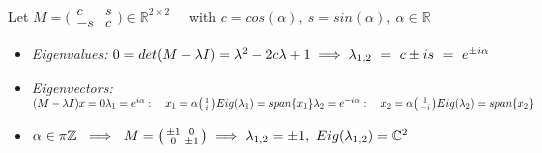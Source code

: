 \begin{SolutionSheet}[\ref{sheet1}]
  \begin{Solution}
    Let $M=\big(\begin{smallmatrix}
      c & s\\
      -s & c
    \end{smallmatrix}\big) \in \mathbb{R}^{2\times 2} \quad$ with $c = cos(\alpha), \ s = sin(\alpha), \ \alpha \in \mathbb{R}$ \\
    \begin{itemize}
      \item \textit{Eigenvalues:} $0 = det(M-\lambda I) = \lambda^2 - 2c\lambda + 1 \\
        \implies \lambda_{1,2} \ = \ c \pm is \ = \ e^{\pm i\alpha}$ \\
      \item \textit{Eigenvectors:} $(M-\lambda I)x = 0 \\
        \lambda_1 = e^{i\alpha}: \quad x_1 = \alpha \big(\begin{smallmatrix}
          1\\
          i
        \end{smallmatrix} \big)\\
        Eig(\lambda_1) = span\{x_1\}
        \lambda_2 = e^{-i\alpha}: \quad x_2 = \alpha \big(\begin{smallmatrix}
          1\\
          -i
        \end{smallmatrix} \big)\\
        Eig(\lambda_2) = span\{x_2\}$
      \item $\alpha \in \pi \mathbb{Z} \ \implies \ M=\big(\begin{smallmatrix}
          \pm 1 & 0\\
          0 & \pm 1
        \end{smallmatrix}\big) \\
        \implies \lambda_{1,2} = \pm 1, \ Eig(\lambda_{1,2}) = \mathbb{C}^2$
    \end{itemize}
  \end{Solution}

  \begin{Solution}[Programming]
  \end{Solution}

\end{SolutionSheet}


